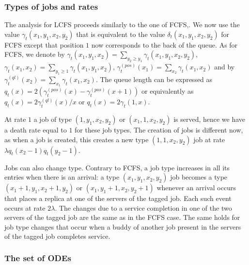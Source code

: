 \documentclass[acmsmall,nonacm]{acmart}
\begin{document}
\subsubsection{Types of jobs and rates}

The analysis for LCFS proceeds similarly to the one of FCFS,. We now use the value $\gamma_t(x_1,y_1,x_2,y_2)$ that is equivalent to the value $\delta_t(x_1,y_1,x_2,y_2)$ for FCFS except that position $1$ now corresponds to the back of the queue. As for FCFS, we denote by $\gamma_t(x_1,y_1,x_2)=\sum_{y_2\ge y_1}\gamma_t(x_1,y_1,x_2,y_2)$,  $\gamma_t(x_1,x_2)=\sum_{y_1\ge1}\gamma_t(x_1,y_1,x_2)$, $\gamma_t^{(pos)}(x_1)=\sum_{x_2} \gamma_t(x_1,x_2)$ and by  $\gamma_t^{(ql)}(x_2)=\sum_{x_1} \gamma_t(x_1,x_2)$. 
The queue length can be expressed as
$q_t(x)=2(\gamma_t^{(pos)}(x)-\gamma_t^{(pos)}(x+1))$
or equivalently as $q_t(x)=2\gamma_t^{(ql)}(x)/x$ or $q_t(x)=2\gamma_t(1,x)$. 


At rate $1$ a job of type $(1,y_1,x_2,y_2)$ or $(x_1,1,x_2,y_2)$ is served, hence we have a death rate equal to $1$ for these job types. The creation of jobs is different now, as when a job is created, this creates a new type $(1,1,x_2,y_2)$ job at rate $\lambda q_t(x_2-1)q_t(y_2-1)$.

Jobs can also change type. Contrary to FCFS, a job type increases in all its entries when there is an arrival:  a type $(x_1,y_1,x_2,y_2)$ job becomes a type
$(x_1+1,y_1,x_2+1,y_2)$ or $(x_1,y_1+1,x_2,y_2+1)$ whenever an arrival occurs that places a replica at one of the servers of the tagged job. Each such event occurs at rate $2\lambda$.   
The changes due to a service completion in one of the two servers of the tagged job are the
same as in the FCFS case. The same holds for job type changes that occur when a buddy of 
another job present in the servers of the tagged job completes service. 


\subsubsection{The set of ODEs}
\end{document}
